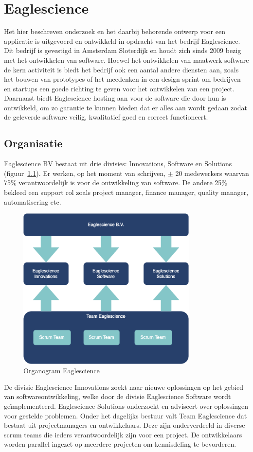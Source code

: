 \chapter{Eaglescience}\label{ch:Eaglescience} %

Het hier beschreven onderzoek en het daarbij behorende ontwerp voor een applicatie is uitgevoerd en ontwikkeld in opdracht van het bedrijf Eaglescience. Dit bedrijf is gevestigd in Amsterdam Sloterdijk en houdt zich sinds 2009 bezig met het ontwikkelen van software. Hoewel het ontwikkelen van maatwerk software de kern activiteit is biedt het bedrijf ook een aantal andere diensten aan, zoals het bouwen van prototypes of het meedenken in een design sprint om bedrijven en startups een goede richting te geven voor het ontwikkelen van een project. Daarnaast biedt Eaglescience hosting aan voor de software die door hun is ontwikkeld, om zo garantie te kunnen bieden dat er alles aan wordt gedaan zodat de geleverde software veilig, kwalitatief goed en correct functioneert.

\section{Organisatie}\label{sec:organisatie}
Eaglescience BV bestaat uit drie divisies: Innovations, Software en Solutions (figuur~\ref{fig:Eaglescience organogram}). Er werken, op het moment van schrijven, $\pm$ 20 medewerkers waarvan 75\% verantwoordelijk is voor de ontwikkeling van software. De andere 25\% bekleed een support rol zoals project manager, finance manager, quality manager, automatisering etc.

\begin{figure}[bth]
\myfloatalign
\includegraphics[width=9cm]{gfx/organogram}
\caption{Organogram Eaglescience}
\label{fig:Eaglescience organogram}
\end{figure}
De divisie Eaglescience Innovations zoekt naar nieuwe oplossingen op het gebied van softwareontwikkeling, welke door de divisie Eaglescience Software wordt geïmplementeerd. Eaglescience Solutions onderzoekt en adviseert over oplossingen voor gestelde problemen. Onder het dagelijks bestuur valt Team Eaglescience dat bestaat uit projectmanagers en ontwikkelaars. Deze zijn onderverdeeld in diverse scrum teams die ieders verantwoordelijk zijn voor een project. De ontwikkelaars worden parallel ingezet op meerdere projecten om kennisdeling te bevorderen.

